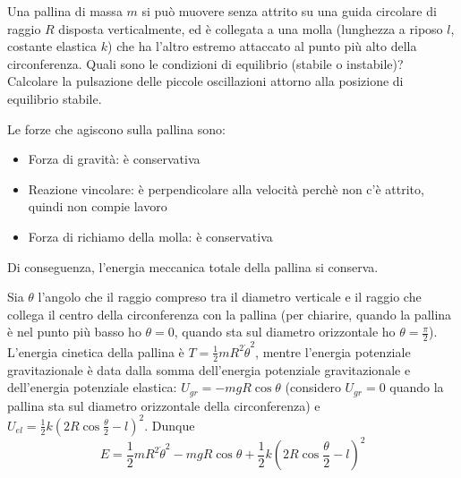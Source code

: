 \documentclass[../main.tex]{subfiles}
\begin{document}

\textex
Una pallina di massa $m$ si può muovere senza attrito su una guida circolare di raggio $R$ disposta verticalmente, ed è collegata a una molla (lunghezza a riposo $l$, costante elastica $k$) che ha l'altro estremo attaccato al punto più alto della circonferenza. Quali sono le condizioni di equilibrio (stabile o instabile)? Calcolare la pulsazione delle piccole oscillazioni attorno alla posizione di equilibrio stabile. %

\solution
Le forze che agiscono sulla pallina sono:
\begin{itemize}
\item Forza di gravità: è conservativa
\item Reazione vincolare: è perpendicolare alla velocità perchè non c'è attrito, quindi non compie lavoro
\item Forza di richiamo della molla: è conservativa
\end{itemize}
Di conseguenza, l'energia meccanica totale della pallina si conserva.

Sia $\theta$ l'angolo che il raggio compreso tra il diametro verticale e il raggio che collega il centro della circonferenza con la pallina (per chiarire, quando la pallina è nel punto più basso ho $\theta = 0$, quando sta sul diametro orizzontale ho $\theta = \frac{\pi}{2}$). L'energia cinetica della pallina è $T=\frac{1}{2}mR^2\dot\theta^2$, mentre l'energia potenziale gravitazionale è data dalla somma dell'energia potenziale gravitazionale e dell'energia potenziale elastica: $U_{gr} = -mgR\cos\theta$ (considero $U_{gr}=0$ quando la pallina sta sul diametro orizzontale della circonferenza) e $U_{el} = \frac{1}{2}k\left ( 2R\cos\frac{\theta}{2} - l\right )^2$. Dunque
\begin{equation}\label{ccm:ConsEnergia}
	E = \frac{1}{2}mR^2\dot\theta^2 - mgR\cos\theta + \frac{1}{2}k\left ( 2R\cos\frac{\theta}{2} - l\right ) ^2
\end{equation}
\end{document}
